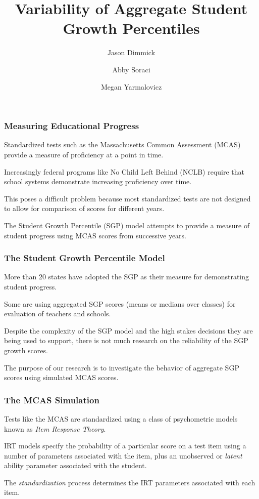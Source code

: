 \documentclass{beamer}
\title{Variability of Aggregate Student Growth Percentiles}
\author[shortname]{Jason Dimmick \and Abby Soraci \and Megan Yarmalovicz}
\institute[shortinst]{Stonehill College / NURE}
\begin{document}
\maketitle

\begin{frame}
\frametitle{Measuring Educational Progress}
Standardized tests such as the Massachusetts Common Assessment (MCAS) provide a measure of proficiency at a point in time.
\par\vspace{0.5 cm}
Increasingly federal programs like No Child Left Behind (NCLB) require that school systems demonstrate increasing proficiency over time.
\par\vspace{0.5 cm}
This poses a difficult problem because most standardized tests are not designed to allow for comparison of scores for different years.
\par\vspace{0.5 cm}
The Student Growth Percentile (SGP) model attempts to provide a measure of student progress using MCAS scores from successive years.
\end{frame}

\begin{frame}
\frametitle{The Student Growth Percentile Model}
More than 20 states have adopted the SGP as their measure for demonstrating student progress.
\par\vspace{0.5 cm}
Some are using aggregated SGP scores (means or medians over classes) for evaluation of teachers and schools.
\par\vspace{0.5 cm}
Despite the complexity of the SGP model and the high stakes decisions they are being used to support, there is not much research on the reliability of the SGP growth scores.
\par\vspace{0.5 cm}
The purpose of our research is to investigate the behavior of aggregate SGP scores using simulated MCAS scores. 
\end{frame}

\begin{frame}
\frametitle{The MCAS Simulation}
Tests like the MCAS are standardized using a class of psychometric models known as \textit{Item Response Theory}.   
\par\vspace{0.5 cm}
IRT models specify the probability of a particular score on a test item using a number of parameters associated with the item, plus an unobserved or \textit{latent} ability parameter associated with the student.
\par\vspace{0.5 cm}
The \textit{standardization} process determines the IRT parameters associated with each item. 
\end{frame}
\end{document}
